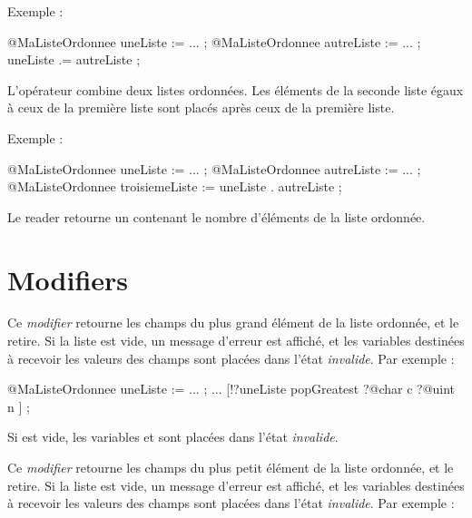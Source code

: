 Exemple :
\begin{galgascode}
@MaListeOrdonnee uneListe := ... ;
@MaListeOrdonnee autreListe := ... ;
uneListe .= autreListe ;
\end{galgascode}


L'opérateur  combine deux listes ordonnées. Les éléments de la seconde liste égaux à ceux de la première liste sont placés après ceux de la première liste.

Exemple :
\begin{galgascode}
@MaListeOrdonnee uneListe := ... ;
@MaListeOrdonnee autreListe := ... ;
@MaListeOrdonnee troisiemeListe := uneListe . autreListe ;
\end{galgascode}








Le reader  retourne un  contenant le nombre d'éléments de la liste ordonnée.






\section{Modifiers}


Ce \emph{modifier} retourne les champs du plus grand élément de la liste ordonnée, et le retire. Si la liste est vide, un message d'erreur est affiché, et les variables destinées à recevoir les valeurs des champs sont placées dans l'état \emph{invalide}. Par exemple :

\begin{galgascode}
@MaListeOrdonnee uneListe := ... ;
...
[!?uneListe popGreatest
  ?@char c
  ?@uint n
] ;
\end{galgascode}

Si  est vide, les variables  et  sont placées dans l'état \emph{invalide}.



Ce \emph{modifier} retourne les champs du plus petit élément de la liste ordonnée, et le retire. Si la liste est vide, un message d'erreur est affiché, et les variables destinées à recevoir les valeurs des champs sont placées dans l'état \emph{invalide}. Par exemple :

